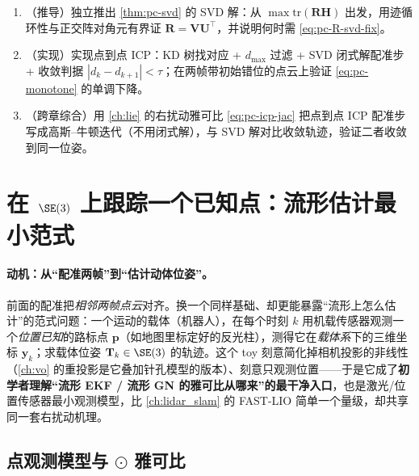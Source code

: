 \begin{practice}
\begin{enumerate}
  \item （推导）独立推出 \cref{thm:pc-svd} 的 SVD 解：从 $\max\mathrm{tr}(\mathbf{R}\mathbf{H})$ 出发，用迹循环性与正交阵对角元有界证 $\mathbf{R}=\mathbf{V}\mathbf{U}^\top$，并说明何时需 \cref{eq:pc-R-svd-fix}。
  \item （实现）实现点到点 ICP：KD 树找对应 + $d_{\max}$ 过滤 + SVD 闭式解配准步 + 收敛判据 $|d_k-d_{k+1}|<\tau$；在两帧带初始错位的点云上验证 \cref{eq:pc-monotone} 的单调下降。
  \item （跨章综合）用 \cref{ch:lie} 的右扰动雅可比 \cref{eq:pc-icp-jac} 把点到点 ICP 配准步写成高斯--牛顿迭代（不用闭式解），与 SVD 解对比收敛轨迹，验证二者收敛到同一位姿。
\end{enumerate}
\end{practice}

\section{在 $\SE(3)$ 上跟踪一个已知点：流形估计最小范式}
\label{sec:pc-track-point}

\paragraph{动机：从“配准两帧”到“估计动体位姿”。}
前面的配准把\emph{相邻两帧点云}对齐。换一个同样基础、却更能暴露“流形上怎么估计”的范式问题\cite{barfoot2024state}：一个运动的载体（机器人），在每个时刻 $k$ 用机载传感器观测一个\emph{位置已知}的路标点 $\mathbf{p}$（如地图里标定好的反光柱），测得它在\emph{载体系}下的三维坐标 $\mathbf{y}_k$；求载体位姿 $\mathbf{T}_k\in\SE(3)$ 的轨迹。这个 toy 刻意简化掉相机投影的非线性（\cref{ch:vo} 的重投影是它叠加针孔模型的版本）、刻意只观测位置——于是它成了\textbf{初学者理解“流形 EKF / 流形 GN 的雅可比从哪来”的最干净入口}，也是激光/位置传感器最小观测模型，比 \cref{ch:lidar_slam} 的 FAST-LIO 简单一个量级，却共享同一套右扰动机理。

\subsection{点观测模型与 $\odot$ 雅可比}
\label{sec:pc-track-model}

